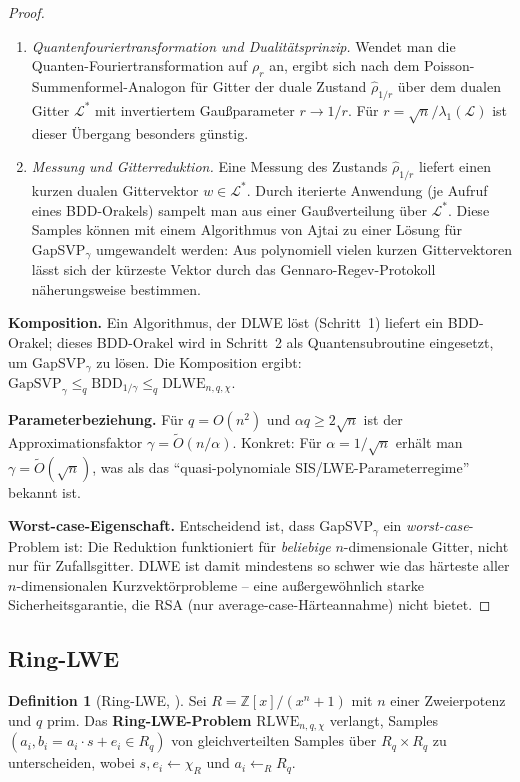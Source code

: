 ﻿\documentclass[a4paper,12pt]{article}
\theoremstyle{definition}
\newtheorem{definition}{Definition}[section]
\begin{document}
\begin{proof}
\begin{enumerate}
\item[(b)] \emph{Quantenfouriertransformation und Dualitätsprinzip.}
Wendet man die Quanten-Fouriertransformation auf $\rho_r$ an, ergibt sich
nach dem Poisson-Summenformel-Analogon für Gitter der duale Zustand
$\hat{\rho}_{1/r}$ über dem dualen Gitter $\mathcal{L}^*$ mit invertiertem
Gaußparameter $r \to 1/r$. Für $r = \sqrt{n}/\lambda_1(\mathcal{L})$ ist dieser
Übergang besonders günstig.

\item[(c)] \emph{Messung und Gitterreduktion.}
Eine Messung des Zustands $\hat{\rho}_{1/r}$ liefert einen kurzen dualen
Gittervektor $w \in \mathcal{L}^*$. Durch iterierte Anwendung
(je Aufruf eines BDD-Orakels) sampelt man aus einer Gaußverteilung über
$\mathcal{L}^*$. Diese Samples können mit einem Algorithmus von Ajtai \cite{Ajt96}
zu einer Lösung für GapSVP$_\gamma$ umgewandelt werden:
Aus polynomiell vielen kurzen Gittervektoren lässt sich der kürzeste Vektor
durch das Gennaro-Regev-Protokoll näherungsweise bestimmen.
\end{enumerate}

\textbf{Komposition.}
Ein Algorithmus, der DLWE löst (Schritt~1) liefert ein BDD-Orakel;
dieses BDD-Orakel wird in Schritt~2 als Quantensubroutine eingesetzt,
um GapSVP$_\gamma$ zu lösen. Die Komposition ergibt:
$\mathrm{GapSVP}_\gamma \leq_q \mathrm{BDD}_{1/\gamma} \leq_q \mathrm{DLWE}_{n,q,\chi}$.

\textbf{Parameterbeziehung.}
Für $q = O(n^2)$ und $\alpha q \geq 2\sqrt{n}$ ist der Approximationsfaktor
$\gamma = \tilde{O}(n/\alpha)$. Konkret: Für $\alpha = 1/\sqrt{n}$ erhält man
$\gamma = \tilde{O}(\sqrt{n})$, was als das ``quasi-polynomiale SIS/LWE-Parameterregime'' bekannt ist.

\textbf{Worst-case-Eigenschaft.}
Entscheidend ist, dass GapSVP$_\gamma$ ein \emph{worst-case}-Problem ist:
Die Reduktion funktioniert für \emph{beliebige} $n$-dimensionale Gitter,
nicht nur für Zufallsgitter. DLWE ist damit mindestens so schwer wie das
härteste aller $n$-dimensionalen Kurzvektörprobleme -- eine außergewöhnlich
starke Sicherheitsgarantie, die RSA (nur average-case-Härteannahme) nicht bietet.
\end{proof}

\subsection{Ring-LWE}

\begin{definition}[Ring-LWE, \cite{LPR10}]
Sei $R = \mathbb{Z}[x]/(x^n + 1)$ mit $n$ einer Zweierpotenz und $q$ prim.
Das \textbf{Ring-LWE-Problem} $\mathrm{RLWE}_{n,q,\chi}$ verlangt,
Samples $(a_i, b_i = a_i \cdot s + e_i \in R_q)$ von gleichverteilten
Samples über $R_q \times R_q$ zu unterscheiden, wobei $s, e_i \leftarrow \chi_R$
und $a_i \leftarrow_R R_q$.
\end{definition}
\end{document}
